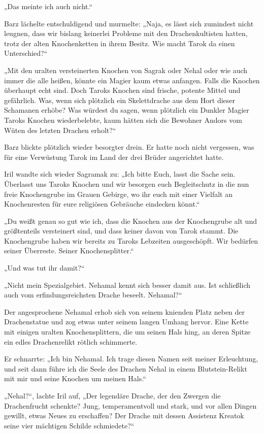 „Das meinte ich auch nicht.“

Barz lächelte entschuldigend und murmelte: „Naja, es lässt sich zumindest nicht leugnen, dass wir bislang keinerlei Probleme mit den Drachenkultisten hatten, trotz der alten Knochenketten in ihrem Besitz. Wie macht Tarok da einen Unterschied?“

„Mit den uralten versteinerten Knochen von Sagrak oder Nehal oder wie auch immer die alle heißen, könnte ein Magier kaum etwas anfangen. Falls die Knochen überhaupt echt sind. Doch Taroks Knochen sind frische, potente Mittel und gefährlich. Was, wenn sich plötzlich ein Skelettdrache aus dem Hort dieser Schamanen erhöbe? Was würdest du sagen, wenn plötzlich ein Dunkler Magier Taroks Knochen wiederbelebte, kaum hätten sich die Bewohner Andors vom Wüten des letzten Drachen erholt?“

Barz blickte plötzlich wieder besorgter drein. Er hatte noch nicht vergessen, was für eine Verwüstung Tarok im Land der drei Brüder angerichtet hatte.

Iril wandte sich wieder Sagramak zu: „Ich bitte Euch, lasst die Sache sein. Überlasst uns Taroks Knochen und wir besorgen euch Begleitschutz in die nun freie Knochengrube im Grauen Gebirge, wo ihr euch mit einer Vielfalt an Knochenresten für eure religiösen Gebräuche eindecken könnt.“

„Du weißt genau so gut wie ich, dass die Knochen aus der Knochengrube alt und größtenteils versteinert sind, und dass keiner davon von Tarok stammt. Die Knochengrube haben wir bereits zu Taroks Lebzeiten ausgeschöpft. Wir bedürfen seiner Überreste. Seiner Knochensplitter.“

„Und was tut ihr damit?“

„Nicht mein Spezialgebiet. Nehamal kennt sich besser damit aus. Ist schließlich auch vom erfindungsreichsten Drache beseelt. Nehamal?“

Der angesprochene Nehamal erhob sich von seinem knienden Platz neben der Drachenstatue und zog etwas unter seinem langen Umhang hervor. Eine Kette mit einigen uralten Knochensplittern, die um seinen Hals hing, an deren Spitze ein edles Drachenrelikt rötlich schimmerte.

Er schnarrte: „Ich bin Nehamal. Ich trage diesen Namen seit meiner Erleuchtung, und seit dann führe ich die Seele des Drachen Nehal in einem Blutstein-Relikt mit mir und seine Knochen um meinen Hals.“

„Nehal?“, lachte Iril auf, „Der legendäre Drache, der den Zwergen die Drachenfrucht schenkte? Jung, temperamentvoll und stark, und vor allen Dingen gewillt, etwas Neues zu erschaffen? Der Drache mit dessen Assistenz Kreatok seine vier mächtigen Schilde schmiedete?“

